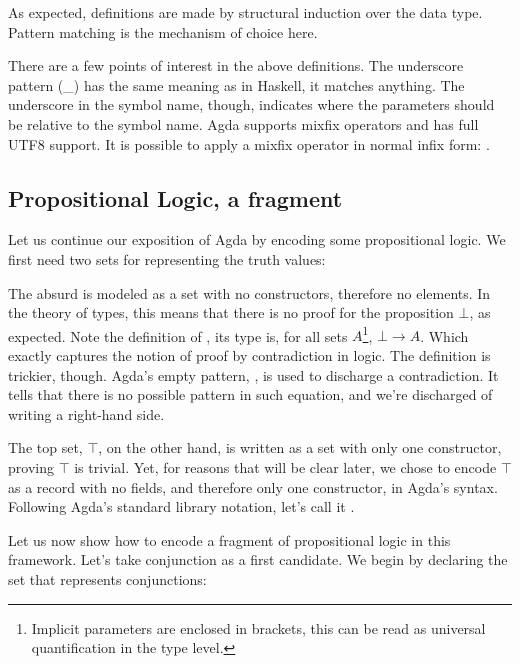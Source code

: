As expected, definitions are made by structural induction over the
data type. Pattern matching is the mechanism of choice here.


There are a few points of interest in the above definitions. The underscore pattern
(\_) has the same meaning as in Haskell, it matches anything. The underscore in
the symbol name, though, indicates where the parameters should be relative to the symbol name. 
Agda supports mixfix operators and has full UTF8 support. It is possible to
apply a mixfix operator in normal infix form: .

\subsection{Propositional Logic, a fragment}

Let us continue our exposition of Agda by encoding some propositional logic. 
We first need two sets for representing the truth values:


The absurd is modeled as a set with no constructors, therefore no elements. In the theory of types,
this means that there is no proof for the proposition $\bot$, as expected. Note the definition
of , its type is, for all sets $A$\footnote{
Implicit parameters are enclosed in brackets, this can be read as universal quantification in
the type level.
}, $\bot \rightarrow A$. Which exactly captures
the notion of proof by contradiction in logic. The definition is trickier, though.
Agda's empty pattern, \inlagda{()}, is used to discharge a contradiction. It tells
that there is no possible pattern in such equation, and we're discharged of writing
a right-hand side.

The top set, $\top$, on the other
hand, is written as a set with only one constructor, proving $\top$ is trivial. Yet, for reasons that will be clear 
later, we chose to encode $\top$ as a record with no fields, and therefore only one constructor,  in Agda's syntax.
Following Agda's standard library notation, let's call it .


Let us now show how to encode a fragment of propositional logic in this framework. Let's take
conjunction as a first candidate. We begin by declaring the set that represents conjunctions:

